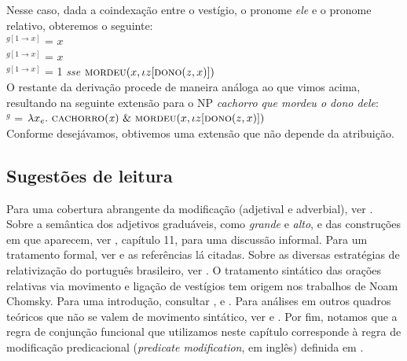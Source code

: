 \n Nesse caso, dada a coindexação entre o vestígio, o pronome
\textit{ele} e o pronome relativo, obteremos o seguinte:\\

\n {}$^{g[1 \rightarrow x]}$ = $x$ \\

\n {}$^{g[1 \rightarrow x]}$ = $x$ \\

\n {}$^{g[1 \rightarrow x]}$ = 1 \textit{sse} $\textsc{mordeu}(x,\iota z[\textsc{dono}(z,x)])$\\

\n O restante da derivação procede de maneira análoga ao que vimos
acima, resultando na seguinte extensão para o NP \textit{cachorro que mordeu o dono dele}:\\

\n {}$^{g}$ = $\lambda x_{e}.\ \predica{cachorro}{x}\ \&\ \textsc{mordeu}(x,\iota z[\textsc{dono}(z,x)])$\\

\n Conforme desejávamos, obtivemos uma extensão que não depende da atribuição.

\bigskip

\begin{tcolorbox}[parbox=false,boxrule=0pt,sharp corners,breakable]

\section*{Sugestões de leitura}

\n Para uma cobertura abrangente da modificação (adjetival e adverbial), ver \cite{morzycki15}. Sobre a semântica dos adjetivos graduáveis, como \textit{grande} e \textit{alto}, e das construções em que aparecem, ver \cite{murphy10}, capítulo 11, para uma discussão informal. Para um tratamento formal, ver \cite{kennedy97} e as referências lá citadas. Sobre as diversas estratégias de relativização do português brasileiro, ver \cite{tarallo90}. O tratamento sintático das orações relativas via movimento e ligação de vestígios tem origem nos trabalhos de Noam Chomsky. Para uma introdução, consultar \cite{carnie13}, \cite{haegeman94} e \cite{mioal05}. Para análises em outros quadros teóricos que não se valem de movimento sintático, ver \cite{sagal03} e \cite{jacobson99}. Por fim, notamos que a regra de conjunção funcional que utilizamos neste capítulo corresponde à regra de modificação predicacional (\textit{predicate modification}, em inglês) definida em \cite{heikra98}. 

\end{tcolorbox}

